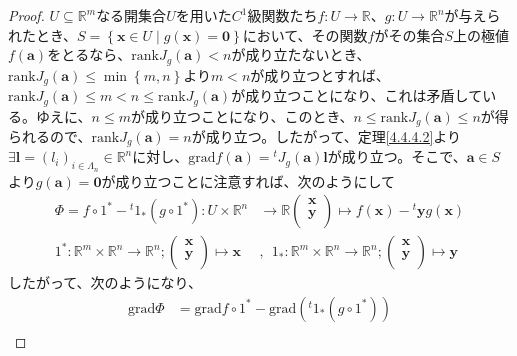 \documentclass[dvipdfmx]{jsarticle}
\begin{document}
\begin{proof}
$U \subseteq \mathbb{R}^{m}$なる開集合$U$を用いた$C^{1}$級関数たち$f:U \rightarrow \mathbb{R}$、$g:U \rightarrow \mathbb{R}^{n}$が与えられたとき、$S = \left\{ \mathbf{x} \in U \middle| g\left( \mathbf{x} \right) = \mathbf{0} \right\}$において、その関数$f$がその集合$S$上の極値$f\left( \mathbf{a} \right)$をとるなら、$\mathrm{rank}{J_{g}\left( \mathbf{a} \right)} < n$が成り立たないとき、$\mathrm{rank}{J_{g}\left( \mathbf{a} \right)} \leq \min\left\{ m,n \right\}$より$m < n$が成り立つとすれば、$\mathrm{rank}{J_{g}\left( \mathbf{a} \right)} \leq m < n \leq \mathrm{rank}{J_{g}\left( \mathbf{a} \right)}$が成り立つことになり、これは矛盾している。ゆえに、$n \leq m$が成り立つことになり、このとき、$n \leq \mathrm{rank}{J_{g}\left( \mathbf{a} \right)} \leq n$が得られるので、$\mathrm{rank}{J_{g}\left( \mathbf{a} \right)} = n$が成り立つ。したがって、定理\ref{4.4.4.2}より$\exists\mathbf{l} = \left( l_{i} \right)_{i \in \varLambda_{n}} \in \mathbb{R}^{n}$に対し、$\mathrm{grad}f\left( \mathbf{a} \right) ={}^t J_{g}\left( \mathbf{a} \right)\mathbf{l}$が成り立つ。そこで、$\mathbf{a} \in S$より$g\left( \mathbf{a} \right) = \mathbf{0}$が成り立つことに注意すれば、次のようにして
\begin{align*}
\varPhi = f \circ 1^{*} -{}^t 1_{*}\left( g \circ 1^{*} \right):U \times \mathbb{R}^{n} &\rightarrow \mathbb{R}\begin{pmatrix}
  \mathbf{x} \\
  \mathbf{y} \\
\end{pmatrix} \mapsto f\left( \mathbf{x} \right) -{}^t \mathbf{y}g\left( \mathbf{x} \right)\\
1^{*}:\mathbb{R}^{m} \times \mathbb{R}^{n} \rightarrow \mathbb{R}^{n};\begin{pmatrix}
\mathbf{x} \\
\mathbf{y} \\
\end{pmatrix} \mapsto \mathbf{x}&,\ \ 
1_{*}:\mathbb{R}^{m} \times \mathbb{R}^{n} \rightarrow \mathbb{R}^{n};\begin{pmatrix}
\mathbf{x} \\
\mathbf{y} \\
\end{pmatrix} \mapsto \mathbf{y} 
\end{align*}
したがって、次のようになり、
\begin{align*}
\mathrm{grad}\varPhi &= \mathrm{grad}{f \circ 1^{*}} - \mathrm{grad}\left({}^t 1_{*}\left( g \circ 1^{*} \right) \right)\\

\end{align*}
\end{proof}
\end{document}
